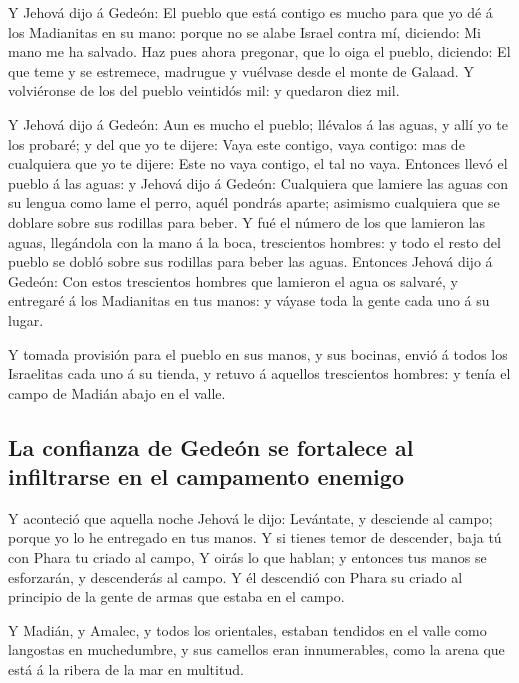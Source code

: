  Y Jehová dijo á Gedeón: El pueblo que está contigo es mucho
para que yo dé á los Madianitas en su mano: porque no se alabe Israel
contra mí, diciendo: Mi mano me ha salvado.  Haz pues ahora
pregonar, que lo oiga el pueblo, diciendo: El que teme y se estremece,
madrugue y vuélvase desde el monte de Galaad. Y volviéronse de los del
pueblo veintidós mil: y quedaron diez mil.

 Y Jehová dijo á Gedeón: Aun es mucho el pueblo; llévalos á
las aguas, y allí yo te los probaré; y del que yo te dijere: Vaya este
contigo, vaya contigo: mas de cualquiera que yo te dijere: Este no vaya
contigo, el tal no vaya.  Entonces llevó el pueblo á las
aguas: y Jehová dijo á Gedeón: Cualquiera que lamiere las aguas con su
lengua como lame el perro, aquél pondrás aparte; asimismo cualquiera que
se doblare sobre sus rodillas para beber.  Y fué el número
de los que lamieron las aguas, llegándola con la mano á la boca,
trescientos hombres: y todo el resto del pueblo se dobló sobre sus
rodillas para beber las aguas.  Entonces Jehová dijo á
Gedeón: Con estos trescientos hombres que lamieron el agua os salvaré, y
entregaré á los Madianitas en tus manos: y váyase toda la gente cada uno
á su lugar.

 Y tomada provisión para el pueblo en sus manos, y sus
bocinas, envió á todos los Israelitas cada uno á su tienda, y retuvo á
aquellos trescientos hombres: y tenía el campo de Madián abajo en el
valle.

\hypertarget{la-confianza-de-gedeuxf3n-se-fortalece-al-infiltrarse-en-el-campamento-enemigo}{%
\subsection{La confianza de Gedeón se fortalece al infiltrarse en el
campamento
enemigo}\label{la-confianza-de-gedeuxf3n-se-fortalece-al-infiltrarse-en-el-campamento-enemigo}}

 Y aconteció que aquella noche Jehová le dijo: Levántate, y
desciende al campo; porque yo lo he entregado en tus manos.
 Y si tienes temor de descender, baja tú con Phara tu
criado al campo,  Y oirás lo que hablan; y entonces tus
manos se esforzarán, y descenderás al campo. Y él descendió con Phara su
criado al principio de la gente de armas que estaba en el campo.

 Y Madián, y Amalec, y todos los orientales, estaban
tendidos en el valle como langostas en muchedumbre, y sus camellos eran
innumerables, como la arena que está á la ribera de la mar en multitud.

